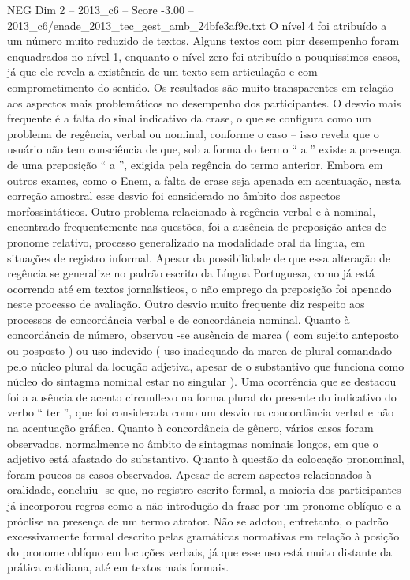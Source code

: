 \begin{textsample}{NEG Dim 2 – 2013\_c6 – Score -3.00 – 2013\_c6/enade\_2013\_tec\_gest\_amb\_24bfe3af9c.txt}
O nível 4 foi atribuído a um número muito reduzido de textos.
Alguns textos com pior desempenho foram enquadrados no nível 1, enquanto o nível zero foi atribuído a pouquíssimos casos, já que ele revela a existência de um texto sem articulação e com comprometimento do sentido.
Os resultados são muito transparentes em relação aos aspectos mais problemáticos no desempenho dos participantes.
O desvio mais frequente é a falta do sinal indicativo da crase, o que se configura como um problema de regência, verbal ou nominal, conforme o caso – isso revela que o usuário não tem consciência de que, sob a forma do termo “ a ” existe a presença de uma preposição “ a ”, exigida pela regência do termo anterior.
Embora em outros exames, como o Enem, a falta de crase seja apenada em acentuação, nesta correção amostral esse desvio foi considerado no âmbito dos aspectos morfossintáticos.
Outro problema relacionado à regência verbal e à nominal, encontrado frequentemente nas questões, foi a ausência de preposição antes de pronome relativo, processo generalizado na modalidade oral da língua, em situações de registro informal.
Apesar da possibilidade de que essa alteração de regência se generalize no padrão escrito da Língua Portuguesa, como já está ocorrendo até em textos jornalísticos, o não emprego da preposição foi apenado neste processo de avaliação.
Outro desvio muito frequente diz respeito aos processos de concordância verbal e de concordância nominal.
Quanto à concordância de número, observou -se ausência de marca ( com sujeito anteposto ou posposto ) ou uso indevido ( uso inadequado da marca de plural comandado pelo núcleo plural da locução adjetiva, apesar de o substantivo que funciona como núcleo do sintagma nominal estar no singular ).
Uma ocorrência que se destacou foi a ausência de acento circunflexo na forma plural do presente do indicativo do verbo “ ter ”, que foi considerada como um desvio na concordância verbal e não na acentuação gráfica.
Quanto à concordância de gênero, vários casos foram observados, normalmente no âmbito de sintagmas nominais longos, em que o adjetivo está afastado do substantivo.
Quanto à questão da colocação pronominal, foram poucos os casos observados.
Apesar de serem aspectos relacionados à oralidade, concluiu -se que, no registro escrito formal, a maioria dos participantes já incorporou regras como a não introdução da frase por um pronome oblíquo e a próclise na presença de um termo atrator.
Não se adotou, entretanto, o padrão excessivamente formal descrito pelas gramáticas normativas em relação à posição do pronome oblíquo em locuções verbais, já que esse uso está muito distante da prática cotidiana, até em textos mais formais.

\end{textsample}
